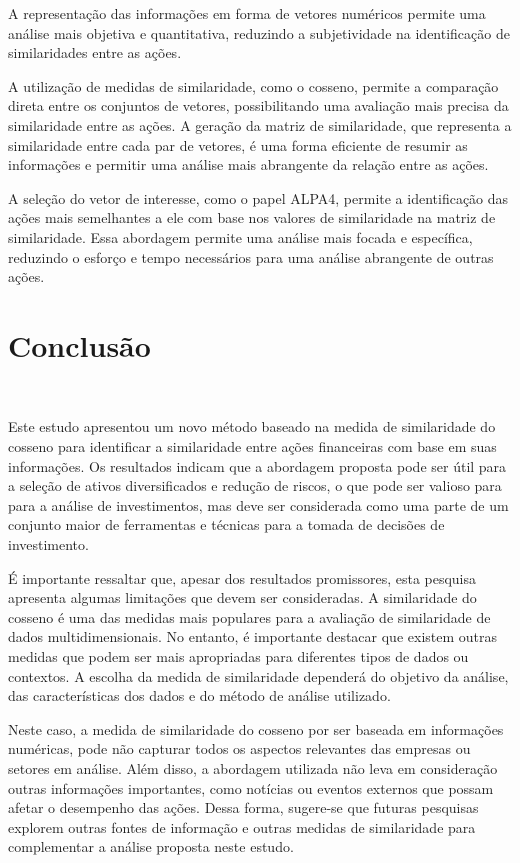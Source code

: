 \documentclass[12pt, a4paper]{article}
\begin{document}
A representação das informações em forma de vetores numéricos permite uma análise mais objetiva e quantitativa, reduzindo a subjetividade na identificação de similaridades entre as ações.\

A utilização de medidas de similaridade, como o cosseno, permite a comparação direta entre os conjuntos de vetores, possibilitando uma avaliação mais precisa da similaridade entre as ações. A geração da matriz de similaridade, que representa a similaridade entre cada par de vetores, é uma forma eficiente de resumir as informações e permitir uma análise mais abrangente da relação entre as ações.\

A seleção do vetor de interesse, como o papel ALPA4, permite a identificação das ações mais semelhantes a ele com base nos valores de similaridade na matriz de similaridade. Essa abordagem permite uma análise mais focada e específica, reduzindo o esforço e tempo necessários para uma análise abrangente de outras ações.


\section{Conclusão}\

Este estudo apresentou um novo método baseado na medida de similaridade do cosseno para identificar a similaridade entre ações financeiras com base em suas informações. Os resultados indicam que a abordagem proposta pode ser útil para a seleção de ativos diversificados e redução de riscos, o que pode ser valioso para para a análise de investimentos, mas deve ser considerada como uma parte de um conjunto maior de ferramentas e técnicas para a tomada de decisões de investimento.\

É importante ressaltar que, apesar dos resultados promissores, esta pesquisa apresenta algumas limitações que devem ser consideradas. A similaridade do cosseno é uma das medidas mais populares para a avaliação de similaridade de dados multidimensionais. No entanto, é importante destacar que existem outras medidas que podem ser mais apropriadas para diferentes tipos de dados ou contextos. A escolha da medida de similaridade dependerá do objetivo da análise, das características dos dados e do método de análise utilizado.\

Neste caso, a medida de similaridade do cosseno por ser baseada em informações numéricas, pode não capturar todos os aspectos relevantes das empresas ou setores em análise. Além disso, a abordagem utilizada não leva em consideração outras informações importantes, como notícias ou eventos externos que possam afetar o desempenho das ações. Dessa forma, sugere-se que futuras pesquisas explorem outras fontes de informação e outras medidas de similaridade para complementar a análise proposta neste estudo. 




\end{document}
